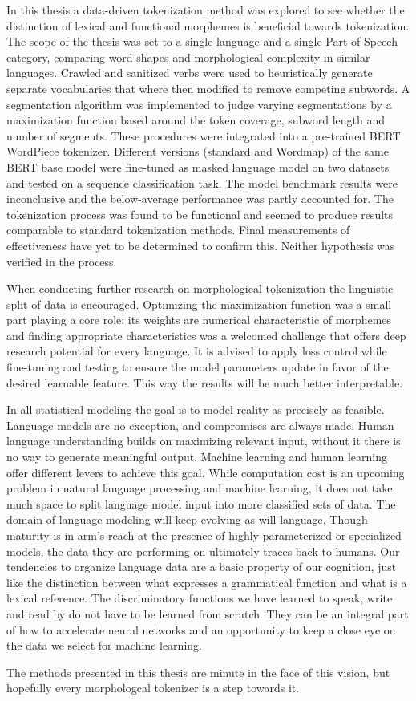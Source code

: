 In this thesis a data-driven tokenization method was explored to see whether the distinction of lexical and functional morphemes is beneficial towards tokenization.
The scope of the thesis was set to a single language and a single Part-of-Speech category, comparing word shapes and morphological complexity in similar languages.
Crawled and sanitized verbs were used to heuristically generate separate vocabularies that where then modified to remove competing subwords.
A segmentation algorithm was implemented to judge varying segmentations by a maximization function based around the token coverage, subword length and number of segments.
These procedures were integrated into a pre-trained BERT WordPiece tokenizer.
Different versions (standard and Wordmap) of the same BERT base model were fine-tuned as masked language model on two datasets and tested on a sequence classification task.
The model benchmark results were inconclusive and the below-average performance was partly accounted for.
The tokenization process was found to be functional and seemed to produce results comparable to standard tokenization methods.
Final measurements of effectiveness have yet to be determined to confirm this.
Neither hypothesis was verified in the process.

When conducting further research on morphological tokenization the linguistic split of data is encouraged.
Optimizing the maximization function was a small part playing a core role: its weights are numerical characteristic of morphemes and finding appropriate characteristics was a welcomed challenge that offers deep research potential for every language.
It is advised to apply loss control while fine-tuning and testing to ensure the model parameters update in favor of the desired learnable feature.
This way the results will be much better interpretable.

In all statistical modeling the goal is to model reality as precisely as feasible.
Language models are no exception, and compromises are always made.
Human language understanding builds on maximizing relevant input, without it there is no way to generate meaningful output.
Machine learning and human learning offer different levers to achieve this goal.
While computation cost is an upcoming problem in natural language processing and machine learning, it does not take much space to split language model input into more classified sets of data.
The domain of language modeling will keep evolving as will language.
Though maturity is in arm's reach at the presence of highly parameterized or specialized models, the data they are performing on ultimately traces back to humans.
Our tendencies to organize language data are a basic property of our cognition, just like the distinction between what expresses a grammatical function and what is a lexical reference.
The discriminatory functions we have learned to speak, write and read by do not have to be learned from scratch.
They can be an integral part of how to accelerate neural networks and an opportunity to keep a close eye on the data we select for machine learning.

The methods presented in this thesis are minute in the face of this vision, but hopefully every morphologcal tokenizer is a step towards it.
